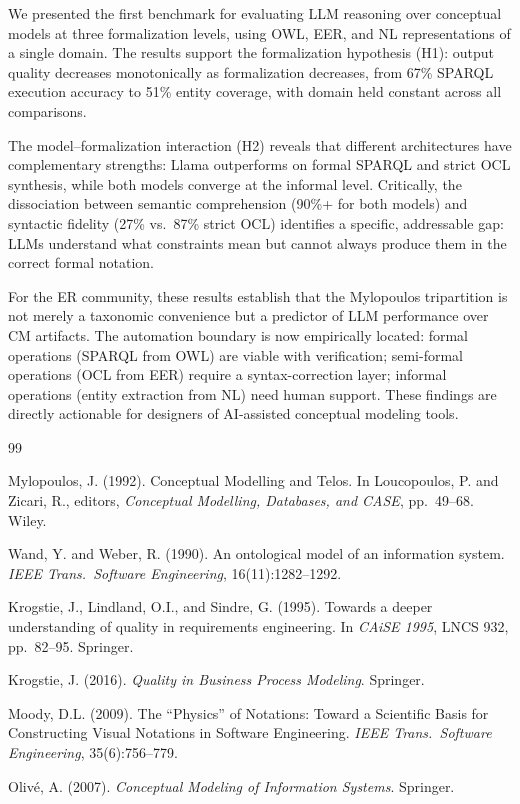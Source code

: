 \documentclass[runningheads]{llncs}
\begin{document}
We presented the first benchmark for evaluating LLM reasoning over conceptual models at three formalization levels, using OWL, EER, and NL representations of a single domain. The results support the formalization hypothesis (H1): output quality decreases monotonically as formalization decreases, from 67\% SPARQL execution accuracy to 51\% entity coverage, with domain held constant across all comparisons.

The model--formalization interaction (H2) reveals that different architectures have complementary strengths: Llama outperforms on formal SPARQL and strict OCL synthesis, while both models converge at the informal level. Critically, the dissociation between semantic comprehension (90\%+ for both models) and syntactic fidelity (27\% vs.\ 87\% strict OCL) identifies a specific, addressable gap: LLMs understand what constraints mean but cannot always produce them in the correct formal notation.

For the ER community, these results establish that the Mylopoulos tripartition is not merely a taxonomic convenience but a predictor of LLM performance over CM artifacts. The automation boundary is now empirically located: formal operations (SPARQL from OWL) are viable with verification; semi-formal operations (OCL from EER) require a syntax-correction layer; informal operations (entity extraction from NL) need human support. These findings are directly actionable for designers of AI-assisted conceptual modeling tools.

\begin{thebibliography}{99}

Mylopoulos, J. (1992).
\newblock Conceptual Modelling and {T}elos.
\newblock In Loucopoulos, P. and Zicari, R., editors, \emph{Conceptual Modelling, Databases, and CASE}, pp.\ 49--68. Wiley.

Wand, Y. and Weber, R. (1990).
\newblock An ontological model of an information system.
\newblock \emph{IEEE Trans.\ Software Engineering}, 16(11):1282--1292.

Krogstie, J., Lindland, O.I., and Sindre, G. (1995).
\newblock Towards a deeper understanding of quality in requirements engineering.
\newblock In \emph{CAiSE 1995}, LNCS 932, pp.\ 82--95. Springer.

Krogstie, J. (2016).
\newblock \emph{Quality in Business Process Modeling}. Springer.

Moody, D.L. (2009).
\newblock The ``Physics'' of Notations: Toward a Scientific Basis for Constructing Visual Notations in Software Engineering.
\newblock \emph{IEEE Trans.\ Software Engineering}, 35(6):756--779.

Oliv\'{e}, A. (2007).
\newblock \emph{Conceptual Modeling of Information Systems}. Springer.

\end{thebibliography}
\end{document}
